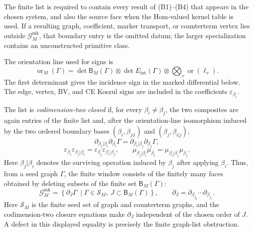 \begin{defn}
  The finite list is required to contain every result of (B1)--(B4) that
  appears in the chosen system, and also the source face when the
  Hom-valued kernel table is used.  If a resulting graph, coefficient,
  marker transport, or counterterm vertex lies outside
  \(\mathcal G^{\mathrm{mk}}_M\), that boundary entry is the omitted datum;
  the larger specialization contains an unconstructed primitive class.

  The orientation line used for signs is
  \[
    \operatorname{or}_M(\Gamma)
      =
    \det\mathsf B_M(\Gamma)\otimes
    \det E_{\mathrm{int}}(\Gamma)\otimes
    \bigotimes_v \operatorname{or}(\ell_v).
  \]
  The first determinant gives the incidence sign in the marked
  differential below.  The edge, vertex, BV, and CE Koszul signs are
  included in the coefficients \(\varepsilon_{\beta_i}\).

  The list is \emph{codimension-two closed} if, for every
  \(\beta_i\neq\beta_j\), the two composites are again entries of the
  finite list and, after the orientation-line isomorphism induced by the
  two ordered boundary bases
  \((\beta_i,\beta_{j|i})\) and \((\beta_j,\beta_{i|j})\),
  \[
    \partial_{\beta_j|\beta_i}\partial_{\beta_i}\Gamma
      =
    \partial_{\beta_i|\beta_j}\partial_{\beta_j}\Gamma,
  \]
  \[
    \varepsilon_{\beta_i}\varepsilon_{\beta_j|\beta_i}
      =
    \varepsilon_{\beta_j}\varepsilon_{\beta_i|\beta_j},
    \qquad
    \mu_{\beta_j|\beta_i}\mu_{\beta_i}
      =
    \mu_{\beta_i|\beta_j}\mu_{\beta_j}.
    \label{eq:app-codim-two-marked-closure}
  \]
  Here \(\beta_j|\beta_i\) denotes the surviving operation induced by
  \(\beta_j\) after applying \(\beta_i\).  Thus, from a seed graph
  \(\Gamma\), the finite window consists of the finitely many
  faces obtained by deleting subsets of the finite set
  \(\mathsf B_M(\Gamma)\):
  \[
    \mathcal G^{\mathrm{mk}}_M
      =
    \left\{
      \partial_J\Gamma\ \middle|
      \Gamma\in\mathcal S_M,\ J\subset\mathsf B_M(\Gamma)
    \right\},
    \qquad
    \partial_J=\partial_{\beta_{j_k}}\cdots\partial_{\beta_{j_1}} .
  \]
  Here \(\mathcal S_M\) is the finite seed set of graph and
  counterterm graphs, and the codimension-two closure equations make
  \(\partial_J\) independent of the chosen order of \(J\).  A defect in
  this displayed equality is precisely the finite graph-list obstruction.
\end{defn}

